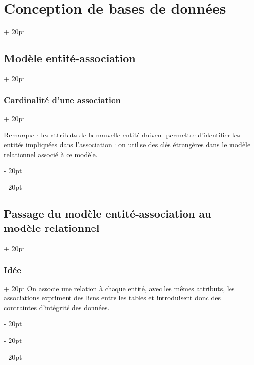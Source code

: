 \documentclass[a4paper, 12pt, twoside]{article}
\newcommand{\ind}[1][20pt]{\advance\leftskip + #1}
\newcommand{\deind}[1][20pt]{\advance\leftskip - #1}
\newenvironment{indt}[2][20pt]{#2 \par \ind[#1]}{\par \deind} %
\begin{document}
\begin{indt}{\section{Conception de bases de données}}
\begin{indt}{\subsection{Modèle entité-association}}
\begin{indt}{\subsubsection{Cardinalité d'une association}}
                \begin{center}
                \end{center}

                Remarque : les attributs de la nouvelle entité doivent permettre d'identifier les entités impliquées dans l'association : on utilise des clés étrangères dans le modèle relationnel associé à ce modèle.
            \end{indt}
        \end{indt}

        \vspace{12pt}
        
        \begin{indt}{\subsection{Passage du modèle entité-association au modèle relationnel}}
            \begin{indt}{\subsubsection{Idée}}
                On associe une relation à chaque  entité, avec les mêmes attributs, les associations expriment des liens entre les tables et introduisent donc des contraintes d'intégrité des données.


\end{indt}
\end{indt}
\end{indt}
\end{document}
